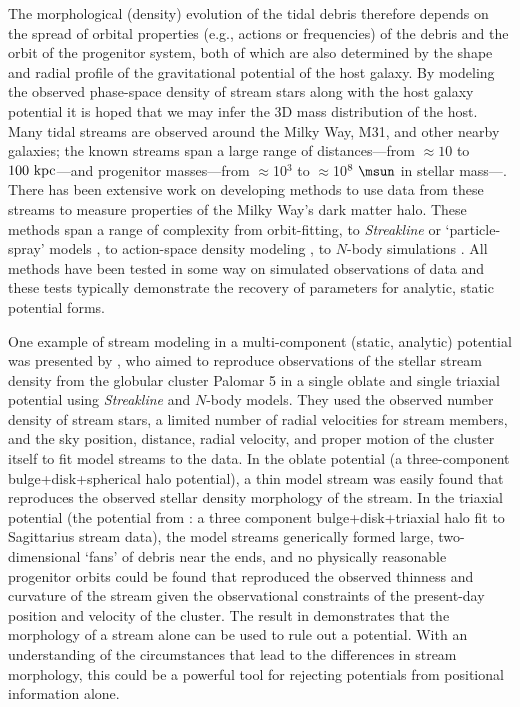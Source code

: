 The morphological (density) evolution of the tidal debris therefore depends on
the spread of orbital properties (e.g., actions or frequencies) of the debris
and the orbit of the progenitor system, both of which are also determined by the
shape and radial profile of the gravitational potential of the host galaxy. By
modeling the observed phase-space density of stream stars along with the host
galaxy potential it is hoped that we may infer the 3D mass distribution of the
host. Many tidal streams are observed around the Milky Way, M31, and other
nearby galaxies; the known streams span a large range of distances---from
$\approx10$ to $100~{\rm kpc}$---and progenitor masses---from $\approx$10$^3$ to
$\approx$10$^8~\msun$ in stellar mass---\citep[][]{ibata94,odenkirchen01,
belokurov06,grillmair06a,grillmair06b,bonaca12}. There has been extensive work
on developing methods to use data from these streams to measure properties of
the Milky Way's dark matter halo. These methods span a range of complexity from
orbit-fitting, to \emph{Streakline} \citep{kuepper12} or `particle-spray' models
\citep{gibbons14}, to action-space density modeling \citep[e.g.,][]{sanders14,
bovy14}, to $N$-body simulations \citep[e.g.,][]{law10}. All methods have been
tested in some way on simulated observations of data and these tests typically
demonstrate the recovery of parameters for analytic, static potential forms.

One example of stream modeling in a multi-component (static, analytic) potential
was presented by \citet{pearson15}, who aimed to reproduce observations of the
stellar stream density from the globular cluster Palomar 5 in a single oblate
and single triaxial potential using \emph{Streakline} \citep{kuepper12} and
$N$-body models. They used the observed number density of stream stars, a limited
number of radial velocities for stream members, and the sky position, distance,
radial velocity, and proper motion of the cluster itself to fit model streams to
the data. In the oblate potential (a three-component bulge+disk+spherical halo
potential), a thin model stream was easily found that reproduces the observed
stellar density morphology of the stream. In the triaxial potential (the
potential from \cite{law10}: a three component bulge+disk+triaxial halo fit to
Sagittarius stream data), the model streams generically formed large,
two-dimensional `fans' of debris near the ends, and no physically reasonable
progenitor orbits could be found that reproduced the observed thinness and
curvature of the stream given the observational constraints of the present-day
position and velocity of the cluster. The result in \citet{pearson15}
demonstrates that the morphology of a stream alone can be used to rule out a
potential. With an understanding of the circumstances that lead to the
differences in stream morphology, this could be a powerful tool for rejecting
potentials from positional information alone.

